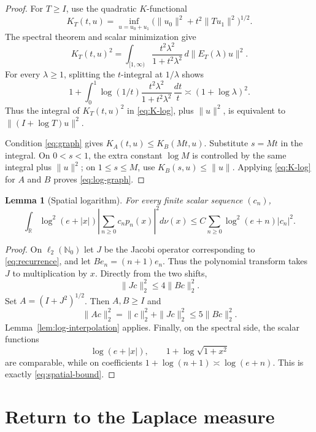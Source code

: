 \documentclass[11pt]{article}
\newtheorem{lemma}[theorem]{Lemma}
\newcommand{\R}{\mathbb R}
\newcommand{\N}{\mathbb N}
\begin{document}
\begin{proof}
For $T\ge I$, use the quadratic $K$-functional
\[
 K_T(t,u)=\inf_{u=u_0+u_1}
 \big(\|u_0\|^2+t^2\|Tu_1\|^2\big)^{1/2}.
\]
The spectral theorem and scalar minimization give
\[
 K_T(t,u)^2=\int_{[1,\infty)}
 \frac{t^2\lambda^2}{1+t^2\lambda^2}\,d\|E_T(\lambda)u\|^2.
\]
For every $\lambda\ge1$, splitting the $t$-integral at $1/\lambda$ shows
\begin{equation}\label{eq:K-log}
 1+\int_0^1\log(1/t)
 \frac{t^2\lambda^2}{1+t^2\lambda^2}\,\frac{dt}{t}
 \asymp (1+\log\lambda)^2.
\end{equation}
Thus the integral of $K_T(t,u)^2$ in \eqref{eq:K-log}, plus $\|u\|^2$,
is equivalent to $\|(I+\log T)u\|^2$.

Condition \eqref{eq:graph} gives $K_A(t,u)\le K_B(Mt,u)$.  Substitute
$s=Mt$ in the integral.  On $0<s<1$, the extra constant $\log M$ is
controlled by the same integral plus $\|u\|^2$; on $1\le s\le M$, use
$K_B(s,u)\le\|u\|$.  Applying \eqref{eq:K-log} for $A$ and $B$ proves
\eqref{eq:log-graph}.
\end{proof}

\begin{lemma}[Spatial logarithm]\label{lem:spatial}
For every finite scalar sequence $(c_n)$,
\begin{equation}\label{eq:spatial-bound}
 \int_\R\log^2(e+|x|)\left|\sum_{n\ge0}c_np_n(x)\right|^2d\nu(x)
 \le C\sum_{n\ge0}\log^2(e+n)|c_n|^2.
\end{equation}
\end{lemma}

\begin{proof}
On $\ell_2(\N_0)$ let $J$ be the Jacobi operator corresponding to
\eqref{eq:recurrence}, and let $Be_n=(n+1)e_n$.  Thus the polynomial
transform takes $J$ to multiplication by $x$.  Directly from the two shifts,
\[
 \|Jc\|_2^2\le4\|Bc\|_2^2.
\]
Set $A=(I+J^2)^{1/2}$.  Then $A,B\ge I$ and
\[
 \|Ac\|_2^2=\|c\|_2^2+\|Jc\|_2^2\le5\|Bc\|_2^2.
\]
Lemma~\ref{lem:log-interpolation} applies.  Finally, on the spectral side,
the scalar functions
\[
 \log(e+|x|),\qquad 1+\log\sqrt{1+x^2}
\]
are comparable, while on coefficients
$1+\log(n+1)\asymp\log(e+n)$.  This is exactly
\eqref{eq:spatial-bound}.
\end{proof}

\section{Return to the Laplace measure}
\end{document}
